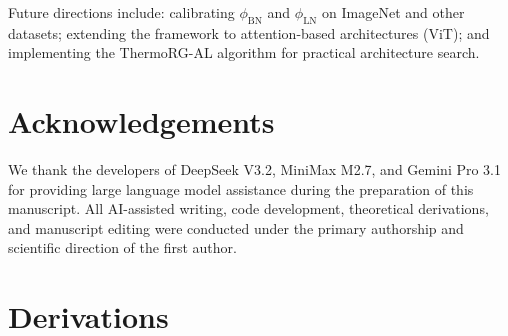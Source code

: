 \documentclass[11pt, a4paper]{article}
\theoremstyle{plain}
\begin{document}
Future directions include: calibrating $\phi_{\mathrm{BN}}$ and $\phi_{\mathrm{LN}}$ on ImageNet and other datasets; extending the framework to attention-based architectures (ViT); and implementing the ThermoRG-AL algorithm for practical architecture search.


\section*{Acknowledgements}
We thank the developers of DeepSeek V3.2, MiniMax M2.7, and Gemini Pro 3.1 for providing large language model assistance during the preparation of this manuscript. All AI-assisted writing, code development, theoretical derivations, and manuscript editing were conducted under the primary authorship and scientific direction of the first author.




\appendix
\section{Derivations}\label{sec:derivations}


\end{document}
